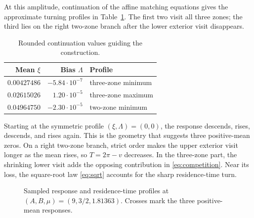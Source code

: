 \documentclass[11pt,a4paper]{article}
\begin{document}
At this amplitude, continuation of the affine matching equations gives
the approximate turning profiles in Table~\ref{tab:construction-turns}. The first two
visit all three zones; the third lies on the right two-zone branch after
the lower exterior visit disappears.
\begin{table}[ht]
\centering
\caption{Rounded continuation values guiding the construction.}\label{tab:construction-turns}
\begin{tabular}{@{}rrl@{}}\toprule
Mean $\xi$ & Bias $\Lambda$ & Profile\\\midrule
$0.00427486$ & $-5.84\cdot10^{-7}$ & three-zone minimum\\
$0.02615026$ & $1.20\cdot10^{-5}$ & three-zone maximum\\
$0.04964750$ & $-2.30\cdot10^{-5}$ & two-zone minimum\\\bottomrule
\end{tabular}
\end{table}
Starting at the symmetric profile $(\xi,\Lambda)=(0,0)$, the response
descends, rises, descends, and rises again. This is the geometry that
suggests three positive-mean zeros. On a right two-zone branch,
strict order makes the upper exterior visit longer as the mean rises,
so $T=2\pi-v$ decreases. In the three-zone part,
the shrinking lower visit adds the opposing contribution in
\eqref{eq:competition}. Near its loss, the square-root law
\eqref{eq:sqrt} accounts for the sharp residence-time turn.

\begin{figure}[ht]
\centering
{}
\caption{Sampled response and residence-time profiles at
$(A,B,\mu)=(9,3/2,1.81363)$. Crosses mark the three positive-mean
responses.}\label{fig:construction}
\end{figure}
\end{document}
